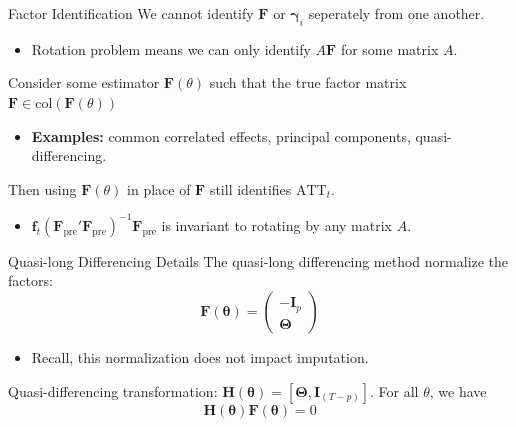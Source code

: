 \documentclass[aspectratio=43,t,11pt]{beamer}
\begin{document}
\begin{frame}{Factor Identification}\label{slide:column_span_condition}
  We cannot identify $\bm F$ or $\bm \gamma_i$ seperately from one another. 
  \begin{itemize}
    \item Rotation problem means we can only identify $A \bm F$ for some matrix $A$.
  \end{itemize}

  Consider some estimator $\bm{F}(\theta)$ such that the true factor matrix $\bm{F} \in \text{col}(\bm{F}(\theta))$
  \begin{itemize}
    \item \textbf{Examples:} common correlated effects, principal components, quasi-differencing.
  \end{itemize}

  \smallskip
  Then using $\bm{F}(\theta)$ in place of $\bm{F}$ still identifies $\text{ATT}_t$.
  \begin{itemize}
    \item $\bm{f}_t (\bm{F}_{\text{pre}}' \bm{F}_{\text{pre}})^{-1} \bm{F}_{\text{pre}}$ is invariant to rotating by any matrix $A$.
  \end{itemize}

\end{frame}


\begin{frame}{Quasi-long Differencing Details}\label{slide:qld_details}
  The quasi-long differencing method  normalize the factors:
  \begin{equation*}
    \bm{F}(\bm{\theta}) = 
    \begin{pmatrix}
        -\bm I_p \\
        \bm \Theta
    \end{pmatrix}
  \end{equation*}

  \begin{itemize}
    \item Recall, this normalization does not impact imputation.
  \end{itemize}

  Quasi-differencing transformation: $\bm H(\bm \theta) = [\bm \Theta, \bm I_{(T-p)}]$. For all $\theta$, we have
  $$
    \bm{H}(\bm{\theta}) \bm{F}(\bm{\theta}) = 0
  $$

\end{frame}
\end{document}
